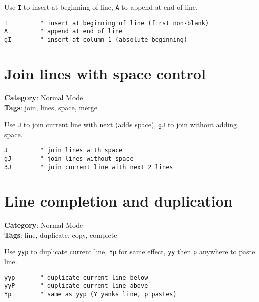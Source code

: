 {{{{{{{{{{Use {\footnotesize \Verb§I§} to insert at beginning of line, {\footnotesize \Verb§A§} to append at end of line.

\begin{Exa*}{}
\begin{Verbatim}[fontsize=\footnotesize, breaklines, breakanywhere]
I         " insert at beginning of line (first non-blank)
A         " append at end of line
gI        " insert at column 1 (absolute beginning)
\end{Verbatim}
\end{Exa*}

\section{Join lines with space control}

\textbf{Category}: Normal Mode\\ \textbf{Tags}: join, lines, space, merge
\vspace{0.5cm}

Use {\footnotesize \Verb§J§} to join current line with next (adds space), {\footnotesize \Verb§gJ§} to join without adding space.

\begin{Exa*}{}
\begin{Verbatim}[fontsize=\footnotesize, breaklines, breakanywhere]
J         " join lines with space
gJ        " join lines without space
3J        " join current line with next 2 lines
\end{Verbatim}
\end{Exa*}

\section{Line completion and duplication}

\textbf{Category}: Normal Mode\\ \textbf{Tags}: line, duplicate, copy, complete
\vspace{0.5cm}

Use {\footnotesize \Verb§yyp§} to duplicate current line, {\footnotesize \Verb§Yp§} for same effect, {\footnotesize \Verb§yy§} then {\footnotesize \Verb§p§} anywhere to paste line.

\begin{Exa*}{}
\begin{Verbatim}[fontsize=\footnotesize, breaklines, breakanywhere]
yyp       " duplicate current line below
yyP       " duplicate current line above
Yp        " same as yyp (Y yanks line, p pastes)
\end{Verbatim}
\end{Exa*}

}}}}}}}}}}

